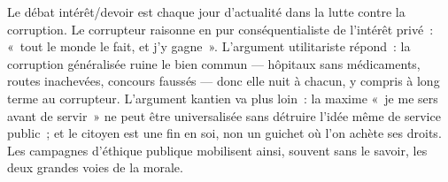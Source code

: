 \documentclass[11pt]{article}
\begin{document}
\begin{savaistu}
Le débat intérêt/devoir est chaque jour d'actualité dans la lutte contre la corruption. Le corrupteur raisonne en pur conséquentialiste de l'intérêt privé~: «~tout le monde le fait, et j'y gagne~». L'argument utilitariste répond~: la corruption généralisée ruine le bien commun — hôpitaux sans médicaments, routes inachevées, concours faussés — donc elle nuit à chacun, y compris à long terme au corrupteur. L'argument kantien va plus loin~: la maxime «~je me sers avant de servir~» ne peut être universalisée sans détruire l'idée même de service public~; et le citoyen est une fin en soi, non un guichet où l'on achète ses droits. Les campagnes d'éthique publique mobilisent ainsi, souvent sans le savoir, les deux grandes voies de la morale.
\end{savaistu}
\end{document}
